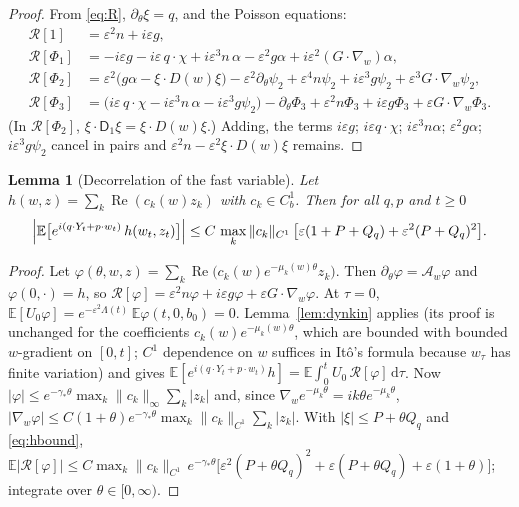 \documentclass[11pt]{article}
\newcommand{\dd}{\mathrm{d}}
\newcommand{\E}{\mathbb{E}}
\newcommand{\eps}{\varepsilon}
\newcommand{\cA}{\mathcal{A}}
\newcommand{\cR}{\mathcal{R}}
\newcommand{\sD}{\mathsf{D}}
\renewcommand{\Re}{\operatorname{Re}}
\newcommand{\nrm}[2]{\|#1\|_{#2}}
\newtheorem{lemma}[theorem]{Lemma}
\theoremstyle{remark}
\begin{document}
\begin{proof}
From \eqref{eq:R}, $\partial_\theta\xi = q$, and the Poisson equations:
\begin{align*}
  \cR[1] &= \eps^2n + i\eps g,\\
  \cR[\Phi_1] &= -i\eps g - i\eps\,q\cdot\chi + i\eps^3n\,\alpha
      - \eps^2g\alpha + i\eps^2(G\cdot\nabla_w)\alpha,\\
  \cR[\Phi_2] &= \eps^2\bigl(g\alpha - \xi\cdot D(w)\xi\bigr)
      - \eps^2\partial_\theta\psi_2 + \eps^4n\psi_2 + i\eps^3g\psi_2
      + \eps^3G\cdot\nabla_w\psi_2,\\
  \cR[\Phi_3] &= \bigl(i\eps\,q\cdot\chi - i\eps^3n\,\alpha - i\eps^3g\psi_2\bigr)
      - \partial_\theta\Phi_3 + \eps^2n\Phi_3 + i\eps g\Phi_3
      + \eps G\cdot\nabla_w\Phi_3 .
\end{align*}
(In $\cR[\Phi_2]$, $\xi\cdot\sD_1\xi = \xi\cdot D(w)\xi$.) Adding, the terms
$i\eps g$; $i\eps q\cdot\chi$; $i\eps^3n\alpha$; $\eps^2g\alpha$;
$i\eps^3g\psi_2$ cancel in pairs and $\eps^2n - \eps^2\xi\cdot D(w)\xi$
remains.
\end{proof}

\begin{lemma}[Decorrelation of the fast variable]\label{lem:decor}
Let $h(w,z) = \sum_k\Re(c_k(w)z_k)$ with $c_k\in C_b^1$. Then for all $q,p$
and $t\ge0$
\[
  \Bigl|\E\bigl[e^{i(q\cdot Y_t+p\cdot w_t)}\,h(w_t,z_t)\bigr]\Bigr|
  \le C\,\max_k\nrm{c_k}{C^1}\,
     \bigl[\eps(1+P+Q_q) + \eps^2(P+Q_q)^2\bigr].
\]
\end{lemma}

\begin{proof}
Let $\varphi(\theta,w,z) = \sum_k\Re\bigl(c_k(w)e^{-\mu_k(w)\theta}z_k\bigr)$.
Then $\partial_\theta\varphi = \cA_w\varphi$ and $\varphi(0,\cdot) = h$, so
$\cR[\varphi] = \eps^2n\varphi + i\eps g\varphi + \eps G\cdot\nabla_w\varphi$.
At $\tau=0$, $\E[U_0\varphi] = e^{-\eps^2\Lambda(t)}\,\E\varphi(t,0,b_0) = 0$.
Lemma~\ref{lem:dynkin} applies (its proof is unchanged for the coefficients
$c_k(w)e^{-\mu_k(w)\theta}$, which are bounded with bounded $w$-gradient on
$[0,t]$; $C^1$ dependence on $w$ suffices in It\^o's formula because $w_\tau$
has finite variation) and gives
$\E[e^{i(q\cdot Y_t+p\cdot w_t)}h] = \E\int_0^tU_0\,\cR[\varphi]\,\dd\tau$.
Now $|\varphi|\le e^{-\gamma_*\theta}\max_k\nrm{c_k}{\infty}\sum_k|z_k|$ and,
since $\nabla_we^{-\mu_k\theta} = ik\theta e^{-\mu_k\theta}$,
$|\nabla_w\varphi|\le C(1+\theta)e^{-\gamma_*\theta}\max_k\nrm{c_k}{C^1}\sum_k|z_k|$.
With $|\xi|\le P+\theta Q_q$ and \eqref{eq:hbound},
$\E|\cR[\varphi]|\le C\max_k\nrm{c_k}{C^1}\,e^{-\gamma_*\theta}
\bigl[\eps^2(P+\theta Q_q)^2 + \eps(P+\theta Q_q) + \eps(1+\theta)\bigr]$;
integrate over $\theta\in[0,\infty)$.
\end{proof}
\end{document}
